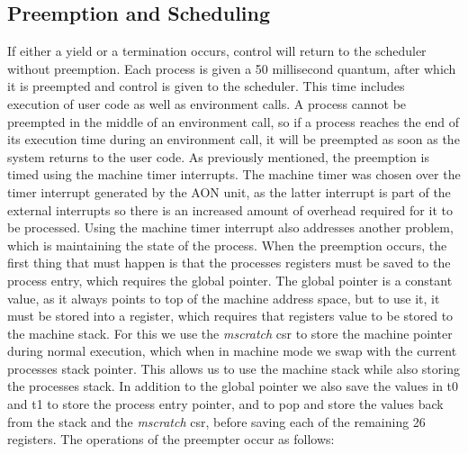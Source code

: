 \subsection{Preemption and Scheduling}
If either a yield or a termination occurs, control will return to the scheduler without preemption. Each process is given a 50 millisecond quantum, after which it is preempted and control is given to the scheduler. This time includes execution of user code as well as environment calls. A process cannot be preempted in the middle of an environment call, so if a process reaches the end of its execution time during an environment call, it will be preempted as soon as the system returns to the user code. As previously mentioned, the preemption is timed using the machine timer interrupts. The machine timer was chosen over the timer interrupt generated by the AON unit, as the latter interrupt is part of the external interrupts so there is an increased amount of overhead required for it to be processed. Using the machine timer interrupt also addresses another problem, which is maintaining the state of the process. When the preemption occurs, the first thing that must happen is that the processes registers must be saved to the process entry, which requires the global pointer. The global pointer is a constant value, as it always points to top of the machine address space, but to use it, it must be stored into a register, which requires that registers value to be stored to the machine stack. For this we use the \textit{mscratch} csr to store the machine pointer during normal execution, which when in machine mode we swap with the current processes stack pointer. This allows us to use the machine stack while also storing the processes stack. In addition to the global pointer we also save the values in t0 and t1 to store the process entry pointer, and to pop and store the values back from the stack and the \textit{mscratch} csr, before saving each of the remaining 26 registers. The operations of the preempter occur as follows:
